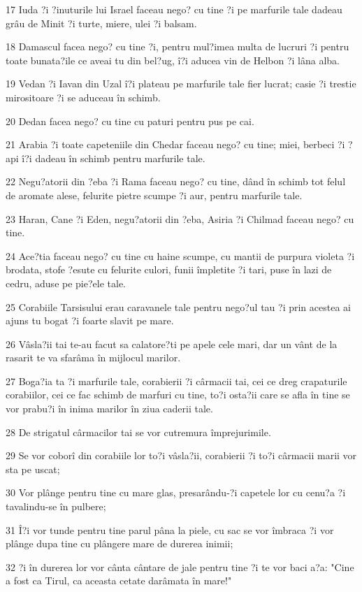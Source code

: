 \par 17 Iuda ?i ?inuturile lui Israel faceau nego? cu tine ?i pe marfurile tale dadeau grâu de Minit ?i turte, miere, ulei ?i balsam.
\par 18 Damascul facea nego? cu tine ?i, pentru mul?imea multa de lucruri ?i pentru toate bunata?ile ce aveai tu din bel?ug, î?i aducea vin de Helbon ?i lâna alba.
\par 19 Vedan ?i Iavan din Uzal î?i plateau pe marfurile tale fier lucrat; casie ?i trestie mirositoare ?i se aduceau în schimb.
\par 20 Dedan facea nego? cu tine cu paturi pentru pus pe cai.
\par 21 Arabia ?i toate capeteniile din Chedar faceau nego? cu tine; miei, berbeci ?i ?api î?i dadeau în schimb pentru marfurile tale.
\par 22 Negu?atorii din ?eba ?i Rama faceau nego? cu tine, dând în schimb tot felul de aromate alese, felurite pietre scumpe ?i aur, pentru marfurile tale.
\par 23 Haran, Cane ?i Eden, negu?atorii din ?eba, Asiria ?i Chilmad faceau nego? cu tine.
\par 24 Ace?tia faceau nego? cu tine cu haine scumpe, cu mantii de purpura violeta ?i brodata, stofe ?esute cu felurite culori, funii împletite ?i tari, puse în lazi de cedru, aduse pe pie?ele tale.
\par 25 Corabiile Tarsisului erau caravanele tale pentru nego?ul tau ?i prin acestea ai ajuns tu bogat ?i foarte slavit pe mare.
\par 26 Vâsla?ii tai te-au facut sa calatore?ti pe apele cele mari, dar un vânt de la rasarit te va sfarâma în mijlocul marilor.
\par 27 Boga?ia ta ?i marfurile tale, corabierii ?i cârmacii tai, cei ce dreg crapaturile corabiilor, cei ce fac schimb de marfuri cu tine, to?i osta?ii care se afla în tine se vor prabu?i în inima marilor în ziua caderii tale.
\par 28 De strigatul cârmacilor tai se vor cutremura împrejurimile.
\par 29 Se vor coborî din corabiile lor to?i vâsla?ii, corabierii ?i to?i cârmacii marii vor sta pe uscat;
\par 30 Vor plânge pentru tine cu mare glas, presarându-?i capetele lor cu cenu?a ?i tavalindu-se în pulbere;
\par 31 Î?i vor tunde pentru tine parul pâna la piele, cu sac se vor îmbraca ?i vor plânge dupa tine cu plângere mare de durerea inimii;
\par 32 ?i în durerea lor vor cânta cântare de jale pentru tine ?i te vor baci a?a: "Cine a fost ca Tirul, ca aceasta cetate darâmata în mare!"
